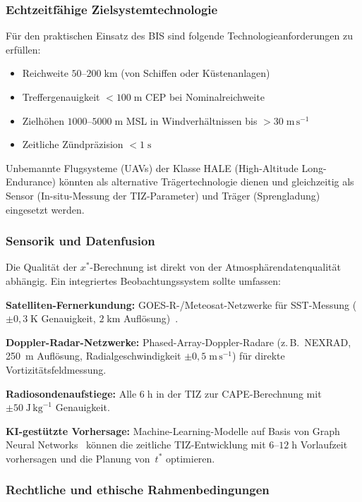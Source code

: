 ﻿\documentclass[a4paper,12pt]{article}
\theoremstyle{definition}
\begin{document}
\subsubsection{Echtzeitf\"{a}hige Zielsystemtechnologie}

F\"{u}r den praktischen Einsatz des BIS sind folgende Technologieanforderungen
zu erf\"{u}llen:
\begin{itemize}
    \item Reichweite $50$--$200\;\mathrm{km}$ (von Schiffen oder K\"{u}stenanlagen)
    \item Treffergenauigkeit $<100\;\mathrm{m}$ CEP bei Nominalreichweite
    \item Zielhöhen $1000$--$5000\;\mathrm{m}$ MSL
          in Windverh\"{a}ltnissen bis $>30\;\mathrm{m\,s}^{-1}$
    \item Zeitliche Z\"{u}ndpräzision $<1\;\mathrm{s}$
\end{itemize}
Unbemannte Flugsysteme (UAVs) der Klasse HALE
(High-Altitude Long-Endurance) k\"{o}nnten als alternative Tr\"{a}gertechnologie
dienen und gleichzeitig als Sensor (In-situ-Messung der TIZ-Parameter)
und Tr\"{a}ger (Sprengladung) eingesetzt werden.

\subsubsection{Sensorik und Datenfusion}

Die Qualit\"{a}t der $x^{*}$-Berechnung ist direkt von der
Atmosph\"{a}rendatenqualit\"{a}t abh\"{a}ngig.
Ein integriertes Beobachtungssystem sollte umfassen:

\textbf{Satelliten-Fernerkundung:} GOES-R-/Meteosat-Netzwerke f\"{u}r SST-Messung
($\pm0{,}3\;\mathrm{K}$ Genauigkeit, $2\;\mathrm{km}$ Aufl\"{o}sung)~\cite{velden2005}.

\textbf{Doppler-Radar-Netzwerke:} Phased-Array-Doppler-Radare (z.\,B.\ NEXRAD,
250~m Aufl\"{o}sung, Radialgeschwindigkeit $\pm0{,}5\;\mathrm{m\,s}^{-1}$)
f\"{u}r direkte Vortizit\"{a}tsfeldmessung.

\textbf{Radiosondenaufstiege:} Alle $6\;\mathrm{h}$ in der TIZ
zur CAPE-Berechnung mit $\pm50\;\mathrm{J\,kg}^{-1}$ Genauigkeit.

\textbf{KI-gest\"{u}tzte Vorhersage:} Machine-Learning-Modelle auf Basis von
Graph Neural Networks~\cite{keisler2022} k\"{o}nnen die zeitliche
TIZ-Entwicklung mit $6$--$12\;\mathrm{h}$ Vorlaufzeit vorhersagen
und die Planung von~$t^{*}$ optimieren.

\subsubsection{Rechtliche und ethische Rahmenbedingungen}
\end{document}
